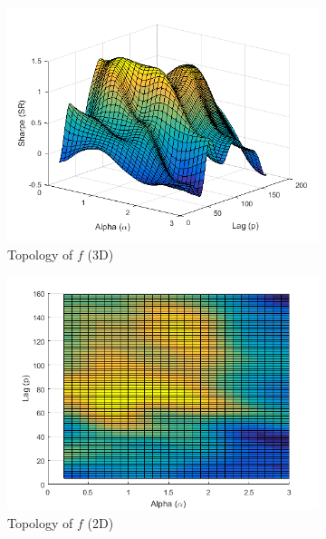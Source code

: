\documentclass[11pt,a4,twosided,singlespacing,titlepagenumber=on]{scrreprt}
\numberwithin{equation}{chapter} %
\theoremstyle{remark}
\begin{document}
\begin{figure}[H]
    \centering
    \begin{subfigure}[t]{0.32\textwidth}
        \centering
        \includegraphics[width=1\textwidth]{surf/1}
        \caption{Topology of $f$ (3D)}
        \label{}
    \end{subfigure}
    \begin{subfigure}[t]{0.32\textwidth}
        \centering
        \includegraphics[width=1\textwidth]{surf/2}
        \caption{Topology of $f$ (2D)}
        \label{vol_mod_sma}
    \end{subfigure}
    \begin{subfigure}[t]{0.32\textwidth}
        \centering

\end{subfigure}
\end{figure}
\end{document}
